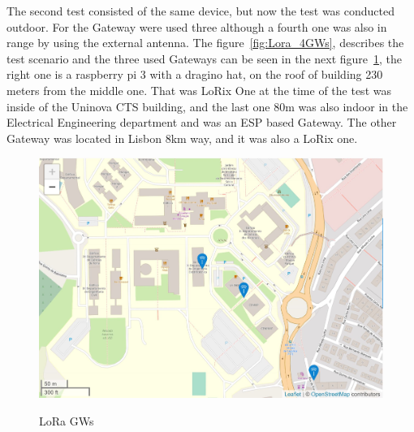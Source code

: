 The second test consisted of the same device, but now the test was conducted outdoor. For the Gateway were used three although a fourth one was also in range by using the external antenna. The figure~\ref{fig:Lora_4GWs}, describes the test scenario and the three used Gateways can be seen in the next figure~\ref{fig:LoRa_GWs}, the right one is a raspberry pi 3 with a dragino hat, on the roof of building 230 meters from the middle one. That was LoRix One at the time of the test was inside of the Uninova CTS building, and the last one 80m  was also indoor in the Electrical Engineering department and was an ESP based Gateway. The other Gateway was located in Lisbon 8km way, and it was also a LoRix one.

\begin{figure}[htbp]
  \centering

    {\includegraphics[width=0.59\linewidth]{Chapters/Figures/ttn3gws.JPG}}%
  \caption{LoRa GWs }
  \label{fig:LoRa_GWs}
\end{figure}


